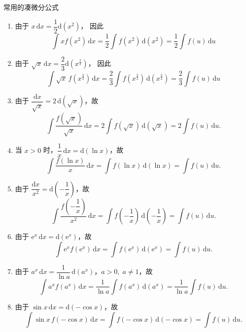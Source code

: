 \documentclass[../book.tex]{subfiles}
\begin{document}
    常用的凑微分公式
    \begin{enumerate}
        \item 由于 $x\,\mathrm{d}x = \dfrac{1}{2}\mathrm{d}(x^2)$，
        因此
        \[
            \int x f(x^2)\,\mathrm{d}x
            = \frac{1}{2}\int f(x^2)\,\mathrm{d}(x^2)
            = \frac{1}{2}\int f(u)\,\mathrm{d}u
        \]

        \item 由于 $\sqrt{x}\,\mathrm{d}x = \dfrac{2}{3}\mathrm{d}(x^{\frac{3}{2}})$，
        因此
        \[
            \int \sqrt{x}\, f(x^{\frac{3}{2}})\,\mathrm{d}x
            = \frac{2}{3}\int f(x^{\frac{3}{2}})\,\mathrm{d}(x^{\frac{3}{2}})
            = \frac{2}{3}\int f(u)\,\mathrm{d}u
        \]

        \item 由于 $\dfrac{\mathrm{d}x}{\sqrt{x}} = 2\,\mathrm{d}(\sqrt{x})$，故
        \[
            \int \frac{f(\sqrt{x})}{\sqrt{x}}\,\mathrm{d}x
            = 2\int f(\sqrt{x})\,\mathrm{d}(\sqrt{x})
            = 2\int f(u)\,\mathrm{d}u.
        \]

        \item 当 $x>0$ 时，$\dfrac{1}{x}\,\mathrm{d}x = \mathrm{d}(\ln x)$，故
        \[
            \int \frac{f(\ln x)}{x}\,\mathrm{d}x
            = \int f(\ln x)\,\mathrm{d}(\ln x)
            = \int f(u)\,\mathrm{d}u.
        \]

        \item 由于 $\dfrac{\mathrm{d}x}{x^2} = \mathrm{d}\!\left(-\dfrac{1}{x}\right)$，故
        \[
            \int \frac{f\!\left(-\dfrac{1}{x}\right)}{x^2}\,\mathrm{d}x
            = \int f\!\left(-\dfrac{1}{x}\right)\,\mathrm{d}\!\left(-\dfrac{1}{x}\right)
            = \int f(u)\,\mathrm{d}u.
        \]

        \item 由于 $\mathrm{e}^x\,\mathrm{d}x = \mathrm{d}(\mathrm{e}^x)$，故
        \[
            \int \mathrm{e}^x f(\mathrm{e}^x)\,\mathrm{d}x
            = \int f(\mathrm{e}^x)\,\mathrm{d}(\mathrm{e}^x)
            = \int f(u)\,\mathrm{d}u.
        \]

        \item 由于 $a^x\,\mathrm{d}x = \dfrac{1}{\ln a}\,\mathrm{d}(a^x)$，$a>0,\; a\neq1$，故
        \[
            \int a^x f(a^x)\,\mathrm{d}x
            = \frac{1}{\ln a}\int f(a^x)\,\mathrm{d}(a^x)
            = \frac{1}{\ln a}\int f(u)\,\mathrm{d}u.
        \]

        \item 由于 $\sin x\,\mathrm{d}x = \mathrm{d}(-\cos x)$，故
        \[
            \int \sin x\,f(-\cos x)\,\mathrm{d}x
            = \int f(-\cos x)\,\mathrm{d}(-\cos x)
            = \int f(u)\,\mathrm{d}u.
        \]


\end{enumerate}
\end{document}
